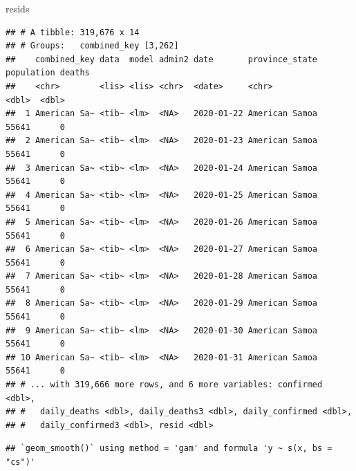 \documentclass[
]{article}
\newenvironment{Shaded}{\begin{snugshade}}{\end{snugshade}}
\newcommand{\DataTypeTok}[1]{\textcolor[rgb]{0.13,0.29,0.53}{#1}}
\newcommand{\DecValTok}[1]{\textcolor[rgb]{0.00,0.00,0.81}{#1}}
\newcommand{\KeywordTok}[1]{\textcolor[rgb]{0.13,0.29,0.53}{\textbf{#1}}}
\newcommand{\NormalTok}[1]{#1}
\newcommand{\OperatorTok}[1]{\textcolor[rgb]{0.81,0.36,0.00}{\textbf{#1}}}
\newcommand{\OtherTok}[1]{\textcolor[rgb]{0.56,0.35,0.01}{#1}}
\newcommand{\StringTok}[1]{\textcolor[rgb]{0.31,0.60,0.02}{#1}}
\begin{document}
\begin{Shaded}
\begin{Highlighting}[]
\NormalTok{resids}
\end{Highlighting}
\end{Shaded}

\begin{verbatim}
## # A tibble: 319,676 x 14
## # Groups:   combined_key [3,262]
##    combined_key data  model admin2 date       province_state population deaths
##    <chr>        <lis> <lis> <chr>  <date>     <chr>               <dbl>  <dbl>
##  1 American Sa~ <tib~ <lm>  <NA>   2020-01-22 American Samoa      55641      0
##  2 American Sa~ <tib~ <lm>  <NA>   2020-01-23 American Samoa      55641      0
##  3 American Sa~ <tib~ <lm>  <NA>   2020-01-24 American Samoa      55641      0
##  4 American Sa~ <tib~ <lm>  <NA>   2020-01-25 American Samoa      55641      0
##  5 American Sa~ <tib~ <lm>  <NA>   2020-01-26 American Samoa      55641      0
##  6 American Sa~ <tib~ <lm>  <NA>   2020-01-27 American Samoa      55641      0
##  7 American Sa~ <tib~ <lm>  <NA>   2020-01-28 American Samoa      55641      0
##  8 American Sa~ <tib~ <lm>  <NA>   2020-01-29 American Samoa      55641      0
##  9 American Sa~ <tib~ <lm>  <NA>   2020-01-30 American Samoa      55641      0
## 10 American Sa~ <tib~ <lm>  <NA>   2020-01-31 American Samoa      55641      0
## # ... with 319,666 more rows, and 6 more variables: confirmed <dbl>,
## #   daily_deaths <dbl>, daily_deaths3 <dbl>, daily_confirmed <dbl>,
## #   daily_confirmed3 <dbl>, resid <dbl>
\end{verbatim}

\begin{Shaded}
\end{Shaded}

\begin{verbatim}
## `geom_smooth()` using method = 'gam' and formula 'y ~ s(x, bs = "cs")'
\end{verbatim}
\end{document}
